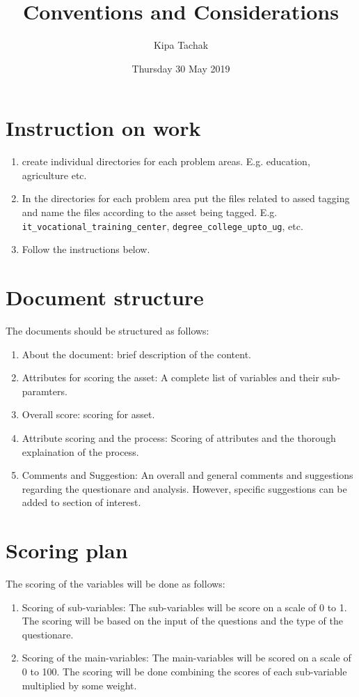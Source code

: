 \documentclass[oneside]{article}
\title{Conventions and Considerations}
\author{Kipa Tachak}
\date{Thursday 30 May 2019}
\begin{document}
\maketitle

\section{Instruction on work}
\begin{enumerate}
\item create individual directories for each problem areas.
E.g. education, agriculture etc.
\item In the directories for each problem area put the
files related to assed tagging and name the files according
to the asset being tagged. E.g. \texttt{it\_vocational\_training\_center},
\texttt{degree\_college\_upto\_ug}, etc.
\item Follow the instructions below.
\end{enumerate}

\section{Document structure}
The documents should be structured as follows:
\begin{enumerate}
\item About the document: brief description of the content.
\item Attributes for scoring the asset: A complete list of
variables and their sub-paramters.
\item Overall score: scoring for asset.
\item Attribute scoring and the process: Scoring of attributes
and the thorough explaination of the process.
\item Comments and Suggestion: An overall and general comments
and suggestions regarding the questionare and analysis. However,
specific suggestions can be added to section of interest.
\end{enumerate}

\section{Scoring plan}
The scoring of the variables will be done as follows:
\begin{enumerate}
\item Scoring of sub-variables: The sub-variables will be score
on a scale of 0 to 1. The scoring will be based on the input of
the questions and the type of the questionare.
\item Scoring of the main-variables:
The main-variables will be scored on a scale of 0 to 100.
The scoring will be done combining the scores of each
sub-variable multiplied by some weight.
\end{enumerate}
\end{document}
